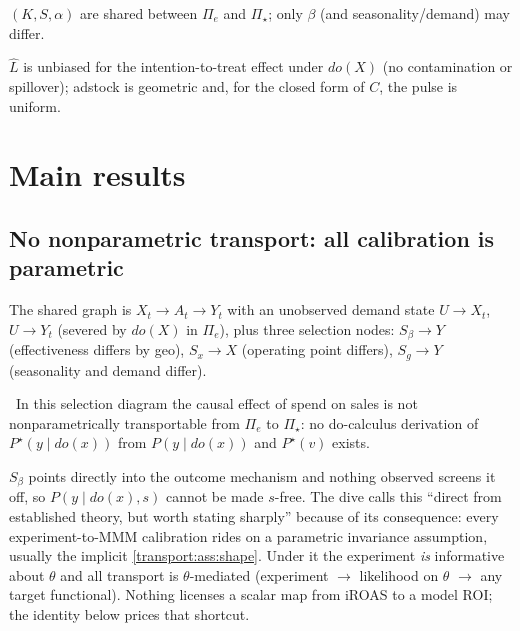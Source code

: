 \begin{assumption}
\label{transport:ass:shape}
$(K, S, \alpha)$ are shared between $\Pi_e$ and $\Pi_\star$; only $\beta$ (and seasonality/demand) may differ.
\end{assumption}

\begin{assumption}
\label{transport:ass:internal}
$\hat L$ is unbiased for the intention-to-treat effect under $do(X)$ (no contamination or spillover); adstock is geometric and, for the closed form of $C$, the pulse is uniform.
\end{assumption}

\section{Main results}

\subsection{No nonparametric transport: all calibration is parametric}

The shared graph is $X_t \to A_t \to Y_t$ with an unobserved demand state $U \to X_t$, $U \to Y_t$ (severed by $do(X)$ in $\Pi_e$), plus three selection nodes: $S_\beta \to Y$ (effectiveness differs by geo), $S_x \to X$ (operating point differs), $S_g \to Y$ (seasonality and demand differ).

\begin{proposition}
\label{transport:prop:nontransport}
\tagEstablished\ In this selection diagram the causal effect of spend on sales is not nonparametrically transportable from $\Pi_e$ to $\Pi_\star$: no do-calculus derivation of $P^\star(y \mid do(x))$ from $P(y \mid do(x))$ and $P^\star(v)$ exists.
\end{proposition}

$S_\beta$ points directly into the outcome mechanism and nothing observed screens it off, so $P(y \mid do(x), s)$ cannot be made $s$-free. The dive calls this ``direct from established theory, but worth stating sharply'' because of its consequence: every experiment-to-MMM calibration rides on a parametric invariance assumption, usually the implicit \cref{transport:ass:shape}. Under it the experiment \emph{is} informative about $\theta$ and all transport is $\theta$-mediated (experiment $\to$ likelihood on $\theta$ $\to$ any target functional). Nothing licenses a scalar map from iROAS to a model ROI; the identity below prices that shortcut.

